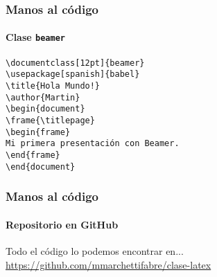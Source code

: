 \documentclass[12pt]{beamer}
\begin{document}
\begin{frame}%
  \frametitle{Manos al código}
  \framesubtitle{Clase \texttt{beamer}}
  \begin{block}{}
    \texttt{\textbackslash documentclass[12pt]\{beamer\}\\
      \textbackslash usepackage[spanish]\{babel\}\\
      \bigskip
      \textbackslash title\{Hola Mundo!\}\\
      \textbackslash author\{Martin\}\\
      \bigskip
      \textbackslash begin\{document\}\\
      \textbackslash frame\{\textbackslash titlepage\}\\
      \bigskip
      \textbackslash begin\{frame\}\\
      Mi primera presentación con Beamer.\\
      \textbackslash end\{frame\}\\
      \bigskip
      \textbackslash end\{document\}
    }
\end{block}
\end{frame}

\begin{frame}%
  \frametitle{Manos al código}
  \framesubtitle{Repositorio en GitHub}
  \begin{block}{Todo el código lo podemos encontrar en...}
    \url{https://github.com/mmarchettifabre/clase-latex}
  \end{block}
\end{frame}
\end{document}
